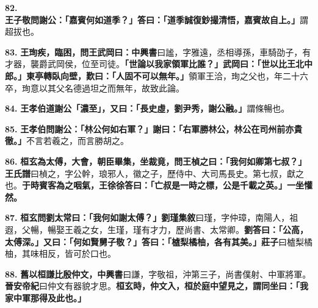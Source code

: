 \textbf{82.} \textbf{王子敬問謝公：「嘉賓何如道季？」答曰：「道季誠復鈔撮清悟，嘉賓故自上。」}{\footnotesize 謂超拔也。}

\textbf{83.} \textbf{王珣疾，臨困，問王武岡曰：}{\footnotesize \textbf{中興書}曰謐，字雅遠，丞相導孫，車騎劭子，有才器，襲爵武岡侯，位至司徒。}\textbf{「世論以我家領軍比誰？」武岡曰：「世以比王北中郎。」東亭轉臥向壁，歎曰：「人固不可以無年。」}{\footnotesize 領軍王洽，珣之父也，年二十六卒，珣意以其父名德過坦之而無年，故致此論。}

\textbf{84.} \textbf{王孝伯道謝公「濃至」，又曰：「長史虛，劉尹秀，謝公融。」}{\footnotesize 謂條暢也。}

\textbf{85.} \textbf{王孝伯問謝公：「林公何如右軍？」謝曰：「右軍勝林公，林公在司州前亦貴徹。」}{\footnotesize 不言若羲之，而言勝胡之。}

\textbf{86.} \textbf{桓玄為太傅，大會，朝臣畢集，坐裁竟，問王楨之曰：「我何如卿第七叔？」}{\footnotesize \textbf{王氏譜}曰楨之，字公幹，琅邪人，徽之子，歷侍中、大司馬長史。第七叔，獻之也。}\textbf{于時賓客為之咽氣，王徐徐答曰：「亡叔是一時之標，公是千載之英。」一坐懽然。}

\textbf{87.} \textbf{桓玄問劉太常曰：「我何如謝太傅？」}{\footnotesize \textbf{劉瑾集敘}曰瑾，字仲璋，南陽人，祖遐，父暢，暢娶王羲之女，生瑾，瑾有才力，歷尚書、太常卿。}\textbf{劉答曰：「公高，太傅深。」又曰：「何如賢舅子敬？」答曰：「樝梨橘柚，各有其美。」}{\footnotesize \textbf{莊子}曰樝梨橘柚，其味相反，皆可於口也。}

\textbf{88.} \textbf{舊以桓謙比殷仲文，}{\footnotesize \textbf{中興書}曰謙，字敬祖，沖第三子，尚書僕射、中軍將軍。\textbf{晉安帝紀}曰仲文有器貌才思。}\textbf{桓玄時，仲文入，桓於庭中望見之，謂同坐曰：「我家中軍那得及此也。」}